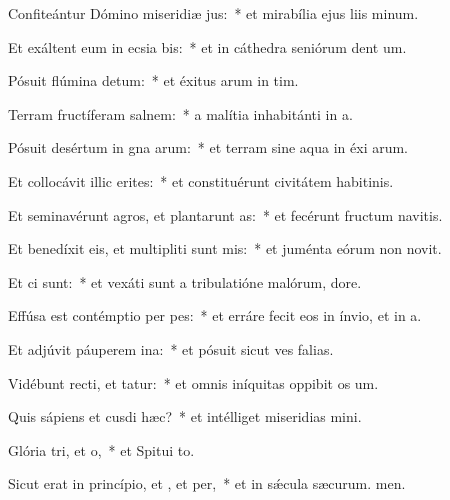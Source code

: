 \item Confiteántur Dómino miseridiæ jus:~* et mirabília ejus liis minum.
\item Et exáltent eum in ecsia bis:~* et in cáthedra seniórum dent um.
\item Pósuit flúmina  detum:~* et éxitus arum in tim.
\item Terram fructíferam  salnem:~* a malítia inhabitánti in a.
\item Pósuit desértum in gna arum:~* et terram sine aqua in éxi arum.
\item Et collocávit illic erites:~* et constituérunt civitátem habitinis.
\item Et seminavérunt agros, et plantarunt as:~* et fecérunt fructum navitis.
\item Et benedíxit eis, et multipliti sunt mis:~* et juménta eórum non novit.
\item Et ci  sunt:~* et vexáti sunt a tribulatióne malórum,  dore.
\item Effúsa est contémptio per pes:~* et erráre fecit eos in ínvio, et  in a.
\item Et adjúvit páuperem  ina:~* et pósuit sicut ves falias.
\item Vidébunt recti, et tatur:~* et omnis iníquitas oppibit os um.
\item Quis sápiens et cusdi hæc?~* et intélliget miseridias mini.
\item Glória tri, et o,~* et Spitui to.
\item Sicut erat in princípio, et , et per,~* et in sǽcula sæcurum. men.
